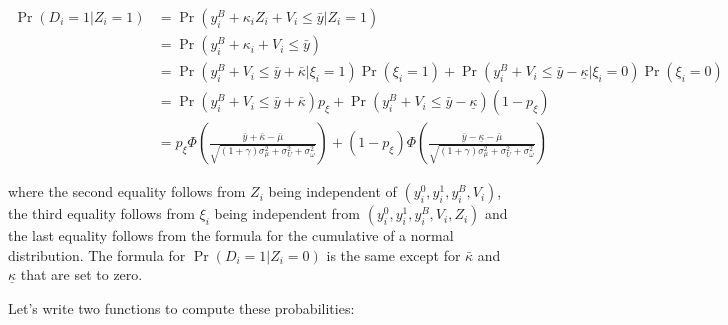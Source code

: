 \documentclass[
]{book}
\theoremstyle{definition}
\theoremstyle{definition}
\theoremstyle{definition}
\theoremstyle{definition}
\theoremstyle{remark}
\begin{document}
\begin{align*}
  \Pr(D_i=1|Z_i=1) & = \Pr(y_i^B+\kappa_i Z_i + V_i\leq\bar{y}|Z_i=1) \\
                  & =  \Pr(y_i^B+\kappa_i + V_i\leq\bar{y}) \\
                  & =  \Pr(y_i^B+ V_i\leq\bar{y}+\bar{\kappa}|\xi_i=1)\Pr(\xi_i=1) + \Pr(y_i^B+V_i\leq\bar{y}-\underline{\kappa}|\xi_i=0)\Pr(\xi_i=0) \\
                                    & =  \Pr(y_i^B+ V_i\leq\bar{y}+\bar{\kappa})p_{\xi} + \Pr(y_i^B+ V_i\leq\bar{y}-\underline{\kappa})(1-p_{\xi}) \\
                  & =  p_{\xi}\Phi\left(\frac{\bar{y}+\bar{\kappa}-\bar{\mu}}{\sqrt{(1+\gamma)\sigma^2_{\mu}+\sigma^2_{U}+\sigma^2_{\omega}}}\right) + (1-p_{\xi})\Phi\left(\frac{\bar{y}-\underline{\kappa}-\bar{\mu}}{\sqrt{(1+\gamma)\sigma^2_{\mu}+\sigma^2_{U}+\sigma^2_{\omega}}}\right)
\end{align*}

where the second equality follows from \(Z_i\) being independent of \((y_i^0,y_i^1,y_i^B,V_i)\), the third equality follows from \(\xi_i\) being independent from \((y_i^0,y_i^1,y_i^B,V_i,Z_i)\) and the last equality follows from the formula for the cumulative of a normal distribution.
The formula for \(\Pr(D_i=1|Z_i=0)\) is the same except for \(\bar{\kappa}\) and \(\underline{\kappa}\) that are set to zero.

Let's write two functions to compute these probabilities:
\end{document}
